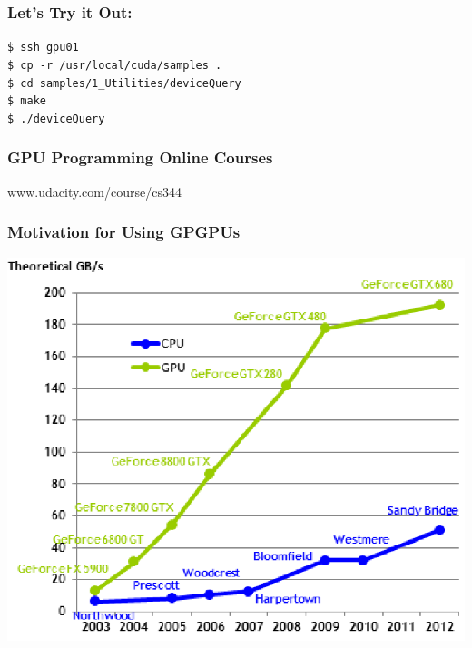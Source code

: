 \documentclass{beamer}
\begin{document}
\begin{frame}[fragile,t]
\frametitle{Let's Try it Out:}

{\tt \$ ssh gpu01}\medskip\\
{\tt \$ cp -r /usr/local/cuda/samples .}\medskip\\
{\tt \$ cd samples/1\_Utilities/deviceQuery}\medskip\\
{\tt \$ make}\medskip\\
{\tt \$ ./deviceQuery}\medskip\\

\end{frame}

\begin{frame}[fragile,t]
\frametitle{GPU Programming Online Courses}

www.udacity.com/course/cs344

\end{frame}

\begin{frame}[fragile,t]
\frametitle{Motivation for Using GPGPUs}

\begin{center}
\includegraphics[height=45ex]{Figures/Lab1/Bandwidth.png}
\end  {center}

\end{frame}
\end{document}
